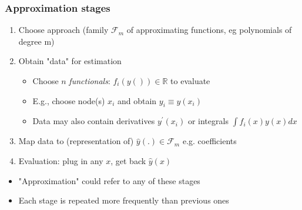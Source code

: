 \documentclass[bigger]{beamer}
\begin{document}
\begin{frame}%
\frametitle{Approximation stages}

\begin{enumerate}
\item Choose approach (family $\mathcal{F}_m$ of approximating functions, eg polynomials of degree m)

\item Obtain "data" for estimation

\begin{itemize}

\item Choose $n$ \emph{functionals}: $f_i(y())\in\mathbb{R}$ to evaluate
\item E.g., choose node(s) $x_{i}$ and obtain $y_{i}\equiv y\left( x_{i}\right)$ 
\item Data may also contain derivatives $y^{\prime }\left( x_{i}\right)$ or integrals $\int f_{i}(x)y(x)dx$
\end{itemize}

\item Map data to (representation of) $\hat{y}(.)\in\mathcal{F}_m$ e.g. coefficients

\item Evaluation: plug in any $x$, get back $\hat{y}\left( x\right) $
\end{enumerate}

\begin{itemize}
\item "Approximation" could refer to any of these stages

\item Each stage is repeated more frequently than previous ones
\end{itemize}

\end{frame}%
\end{document}
